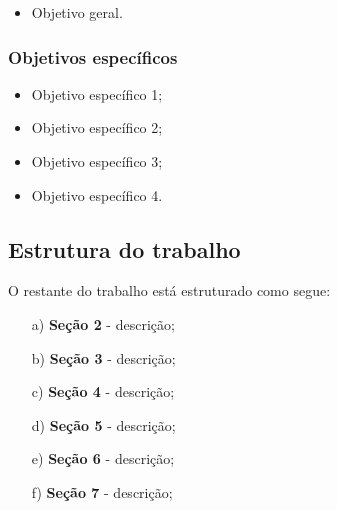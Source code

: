 \begin{itemize}
	\item Objetivo geral.
\end{itemize}

\subsubsection*{Objetivos específicos}
\begin{itemize}
\item Objetivo específico 1;
\item Objetivo específico 2;
\item Objetivo específico 3;
\item Objetivo específico 4.
\end{itemize}

\subsection*{Estrutura do trabalho}

O restante do trabalho está estruturado como segue:

\begin{enumerate}
\item[a)] \textbf{Seção 2} - descrição;
\item[b)] \textbf{Seção 3} - descrição;
\item[c)] \textbf{Seção 4} - descrição;
\item[d)] \textbf{Seção 5} - descrição;
\item[e)] \textbf{Seção 6} - descrição;
\item[f)] \textbf{Seção 7} - descrição;
\end{enumerate}
